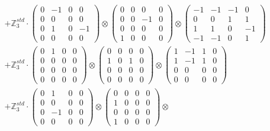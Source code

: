 \documentclass{article}
\begin{document}
{\begin{align}
        &+ \label{Rs16-Rc11-Solution-15-c22} \mathbb{Z}_3^{std} \cdot 
            \begin{pmatrix} 0 & -1 & 0 & 0 \\ 0 & 0 & 0 & 0 \\ 0 & 1 & 0 & -1 \\ 0 & 0 & 0 & 0 \end{pmatrix} \otimes 
            \begin{pmatrix} 0 & 0 & 0 & 0 \\ 0 & 0 & -1 & 0 \\ 0 & 0 & 0 & 0 \\ 1 & 0 & 0 & 0 \end{pmatrix} \otimes 
            \begin{pmatrix} -1 & -1 & -1 & 0 \\ 0 & 0 & 1 & 1 \\ 1 & 1 & 0 & -1 \\ -1 & -1 & 0 & 1 \end{pmatrix} \\ 
        &+ \label{Rs16-Rc11-Solution-15-c23} \mathbb{Z}_3^{std} \cdot 
            \begin{pmatrix} 0 & 1 & 0 & 0 \\ 0 & 0 & 0 & 0 \\ 0 & 0 & 0 & 0 \\ 0 & 0 & 0 & 0 \end{pmatrix} \otimes 
            \begin{pmatrix} 0 & 0 & 0 & 0 \\ 1 & 0 & 1 & 0 \\ 0 & 0 & 0 & 0 \\ 0 & 0 & 0 & 0 \end{pmatrix} \otimes 
            \begin{pmatrix} 1 & -1 & 1 & 0 \\ 1 & -1 & 1 & 0 \\ 0 & 0 & 0 & 0 \\ 0 & 0 & 0 & 0 \end{pmatrix} \\ 
        &+ \label{Rs16-Rc11-Solution-15-c24} \mathbb{Z}_3^{std} \cdot 
            \begin{pmatrix} 0 & 1 & 0 & 0 \\ 0 & 0 & 0 & 0 \\ 0 & -1 & 0 & 0 \\ 0 & 0 & 0 & 0 \end{pmatrix} \otimes 
            \begin{pmatrix} 0 & 0 & 0 & 0 \\ 1 & 0 & 0 & 0 \\ 0 & 0 & 0 & 0 \\ 1 & 0 & 0 & 0 \end{pmatrix} \otimes 

\end{align}}
\end{document}
